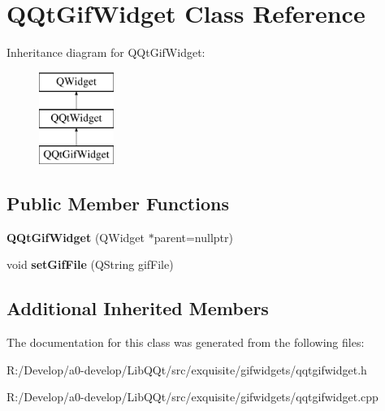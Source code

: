 \hypertarget{class_q_qt_gif_widget}{}\section{Q\+Qt\+Gif\+Widget Class Reference}
\label{class_q_qt_gif_widget}
Inheritance diagram for Q\+Qt\+Gif\+Widget\+:\begin{figure}[H]
\begin{center}
\leavevmode
\includegraphics[height=3.000000cm]{class_q_qt_gif_widget}
\end{center}
\end{figure}
\subsection*{Public Member Functions}
\begin{DoxyCompactItemize}
\item 
\mbox{\label{class_q_qt_gif_widget_aa0043b6590733907dc6aca0fb2f8bdaa}} 
{\bfseries Q\+Qt\+Gif\+Widget} (Q\+Widget $\ast$parent=nullptr)
\item 
\mbox{\label{class_q_qt_gif_widget_a5e2e7e63fe9fbfc69c18d0a5098a2984}} 
void {\bfseries set\+Gif\+File} (Q\+String gif\+File)
\end{DoxyCompactItemize}
\subsection*{Additional Inherited Members}


The documentation for this class was generated from the following files\+:\begin{DoxyCompactItemize}
\item 
R\+:/\+Develop/a0-\/develop/\+Lib\+Q\+Qt/src/exquisite/gifwidgets/qqtgifwidget.\+h\item 
R\+:/\+Develop/a0-\/develop/\+Lib\+Q\+Qt/src/exquisite/gifwidgets/qqtgifwidget.\+cpp\end{DoxyCompactItemize}
